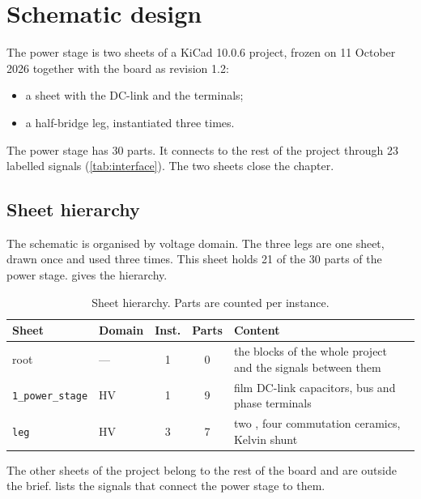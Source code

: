 \chapter{Schematic design}
\label{ch:schematic}

The power stage is two sheets of a KiCad 10.0.6 project, frozen on
11 October 2026 together with the board as revision 1.2:
\begin{itemize}
  \item a sheet with the DC-link and the terminals;
  \item a half-bridge leg, instantiated three times.
\end{itemize}
The power stage has 30 parts. It connects to the rest of the project through 23
labelled signals (\cref{tab:interface}). The two sheets close the chapter.

\section{Sheet hierarchy}

The schematic is organised by voltage domain. The three legs are one sheet,
drawn once and used three times. This sheet holds 21 of the 30 parts of the
power stage.  gives the hierarchy.

\begin{table}[H]
\centering
\caption{Sheet hierarchy. Parts are counted per instance.}
\label{tab:sheets}
\small
\zebra
\begin{tabularx}{\textwidth}{llccY}
\toprule
Sheet & Domain & Inst. & Parts & Content \\
\midrule
root & --- & 1 & 0 & the blocks of the whole project and the signals between them \\
\texttt{1\_power\_stage} & HV & 1 & 9 & film DC-link capacitors, bus and phase terminals \\
\quad\texttt{leg} & HV & 3 & 7 & two \device{}, four commutation ceramics, Kelvin shunt \\
\bottomrule
\end{tabularx}
\end{table}

The other sheets of the project belong to the rest of the board and are
outside the brief.  lists the signals that connect the
power stage to them.

